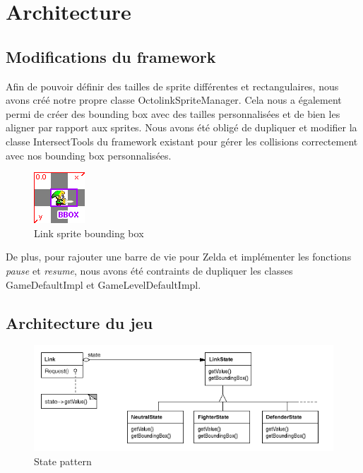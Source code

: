 \chapter{Architecture}

\section{Modifications du framework}

Afin de pouvoir définir des tailles de sprite différentes et rectangulaires,
nous avons créé notre propre classe OctolinkSpriteManager. Cela nous a également
permi de créer des bounding box avec des tailles personnalisées et de bien les
aligner par rapport aux sprites. Nous avons été obligé de dupliquer et
modifier la classe IntersectTools du framework existant pour gérer les
collisions correctement avec nos bounding box personnalisées.

\begin{figure}[ht!]
  \center
  \includegraphics{resources/bbox.png}
  \caption{Link sprite bounding box}
  \label{fig:Link sprite bounding box}
\end{figure}

De plus, pour rajouter une barre de vie pour Zelda et implémenter les fonctions
\emph{pause} et \emph{resume}, nous avons été contraints de dupliquer les
classes GameDefaultImpl et GameLevelDefaultImpl.


\newpage
\section{Architecture du jeu}

\begin{figure}[ht!]
  \center
  \includegraphics[width=16cm,keepaspectratio]{resources/state_pattern.png}
  \caption{State pattern}
  \label{fig:State pattern}
\end{figure}

